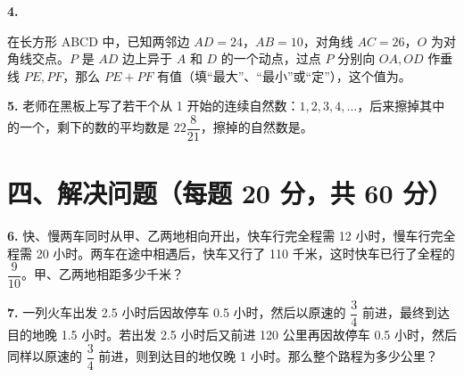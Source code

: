 \documentclass[UTF8,12pt,a4paper]{ctexart}
\begin{document}
\noindent \textbf{4.} 
\begin{minipage}[t]{0.70\textwidth}
在长方形 ABCD 中，已知两邻边 $AD=24$，$AB=10$，对角线 $AC=26$，$O$ 为对角线交点。$P$ 是 $AD$ 边上异于 $A$ 和 $D$ 的一个动点，过点 $P$ 分别向 $OA, OD$ 作垂线 $PE, PF$，那么 $PE+PF$ 有\underline{\hspace{3em}}值（填“最大”、“最小”或“定”），这个值为\underline{\hspace{3em}}。
\end{minipage}
\hfill
\begin{minipage}[t]{0.25\textwidth}
\vspace{-0.5cm}
\end{minipage}

\vspace{1.5cm}

\noindent \textbf{5.} 老师在黑板上写了若干个从 1 开始的连续自然数：$1, 2, 3, 4, \dots$，后来擦掉其中的一个，剩下的数的平均数是 $22\dfrac{8}{21}$，擦掉的自然数是\underline{\hspace{3em}}。

\vspace{0.5cm}
\newpage

\section*{四、解决问题（每题 20 分，共 60 分）}
\vspace{0.5cm}

\noindent \textbf{6.} 快、慢两车同时从甲、乙两地相向开出，快车行完全程需 12 小时，慢车行完全程需 20 小时。两车在途中相遇后，快车又行了 110 千米，这时快车已行了全程的 $\dfrac{9}{10}$。甲、乙两地相距多少千米？
\vspace{7cm}

\noindent \textbf{7.} 一列火车出发 2.5 小时后因故停车 0.5 小时，然后以原速的 $\dfrac{3}{4}$ 前进，最终到达目的地晚 1.5 小时。若出发 2.5 小时后又前进 120 公里再因故停车 0.5 小时，然后同样以原速的 $\dfrac{3}{4}$ 前进，则到达目的地仅晚 1 小时。那么整个路程为多少公里？
\vspace{7cm}
\end{document}

